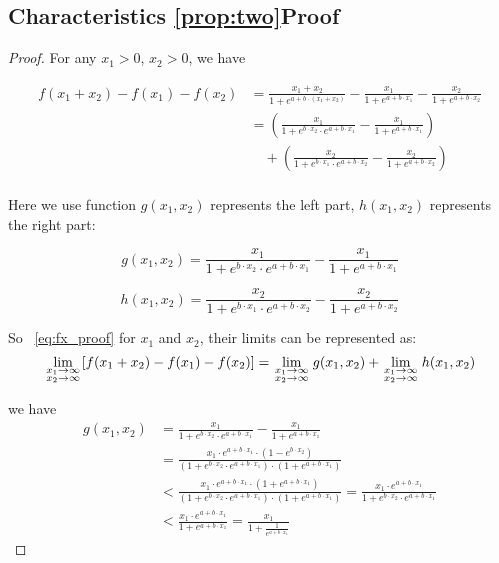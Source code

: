 \subsection{Characteristics \ref{prop:two}Proof}
\begin{proof}
For any $x_1>0$, $x_2>0$, we have

\begin{equation}
\label{eq:fx_proof}
\begin{aligned}
f(x_1+x_2)-f(x_1)-f(x_2)&=\frac{x_1+x_2}{1+e^{a+b\cdot (x_1+x_2)}}-\frac{x_1}{1+e^{a+b\cdot x_1}}-\frac{x_2}{1+e^{a+b\cdot x_2}}\\
&=(\frac{x_1}{1+e^{b\cdot x_2}\cdot e^{a+b\cdot {x_1}}}-\frac{x_1}{1+e^{a+b\cdot x_1}})\\
&\quad +(\frac{x_2}{1+e^{b\cdot x_1}\cdot e^{a+b\cdot {x_2}}}-\frac{x_2}{1+e^{a+b\cdot x_2}})\\
\end{aligned}
\end{equation}

Here we use function $g(x_1,x_2)$ represents the left part, $h(x_1,x_2)$ represents the right part:

\begin{equation}
\label{eq:gx_func_proof}
g(x_1,x_2)=\frac{x_1}{1+e^{b\cdot x_2}\cdot e^{a+b\cdot {x_1}}}-\frac{x_1}{1+e^{a+b\cdot x_1}}
\end{equation}

\begin{equation}
\label{eq:hx_func_proof}
h(x_1,x_2)=\frac{x_2}{1+e^{b\cdot x_1}\cdot e^{a+b\cdot {x_2}}}-\frac{x_2}{1+e^{a+b\cdot x_2}}
\end{equation}

So ~\eqref{eq:fx_proof} for $x_1$ and $x_2$, their limits can be represented as:
\[
\mathop {\lim }\limits_{\scriptstyle x_1 \to \infty  \hfill \atop  \scriptstyle x_2 \to \infty  \hfill}[f(x_1+x_2)-f(x_1)-f(x_2)]=\mathop {\lim }\limits_{\scriptstyle x_1 \to \infty  \hfill \atop  \scriptstyle x_2 \to \infty  \hfill}g(x_1,x_2)+\mathop {\lim }\limits_{\scriptstyle x_1 \to \infty  \hfill \atop  \scriptstyle x_2 \to \infty  \hfill}h(x_1,x_2)
\]

we have
\[
\begin{aligned}
g(x_1,x_2)&=\frac{x_1}{1+e^{b\cdot x_2}\cdot e^{a+b\cdot {x_1}}}-\frac{x_1}{1+e^{a+b\cdot x_1}}\\
&=\frac{x_1\cdot e^{a+b\cdot x_1}\cdot(1-e^{b\cdot x_2})}{(1+e^{b\cdot x_2}\cdot e^{a+b\cdot x_1})\cdot(1+e^{a+b\cdot x_1})}\\
&<\frac{x_1\cdot e^{a+b\cdot x_1}\cdot(1+e^{a+b\cdot x_1})}{(1+e^{b\cdot x_2}\cdot e^{a+b\cdot x_1})\cdot(1+e^{a+b\cdot x_1})}=\frac{x_1\cdot e^{a+b\cdot x_1}}{1+e^{b\cdot x_2}\cdot e^{a+b\cdot x_1}}\\
&<\frac{x_1\cdot e^{a+b\cdot x_1}}{1+e^{a+b\cdot x_1}}=\frac{x_1}{1+\frac{1}{e^{a+b\cdot x_1}}}
\end{aligned}
\]


\end{proof}

